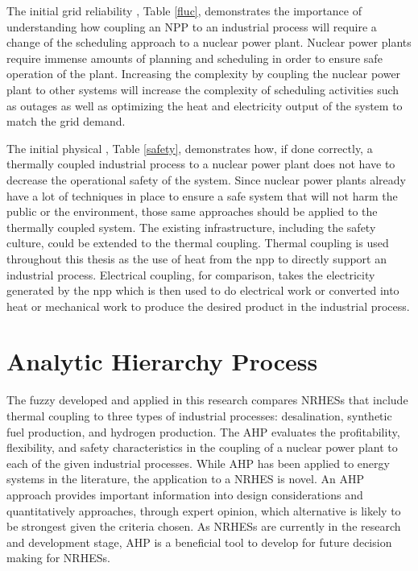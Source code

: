 The initial grid reliability \cite{pha}, Table \ref{fluc}, demonstrates the importance of understanding how coupling an NPP to an industrial process will require a change of the scheduling approach to a nuclear power plant. Nuclear power plants require immense amounts of planning and scheduling in order to ensure safe operation of the plant.  Increasing the complexity by coupling the nuclear power plant to other systems will increase the complexity of scheduling activities such as outages as well as optimizing the heat and electricity output of the system to match the grid demand.

The initial physical \cite{pha}, Table \ref{safety},  demonstrates how, if done correctly, a thermally coupled industrial process to a nuclear power plant does not have to decrease the operational safety of the system.  Since nuclear power plants already have a lot of techniques in place to ensure a safe system that will not harm the public or the environment, those same approaches should be applied to the thermally coupled system. The existing infrastructure, including the safety culture, could be extended to the thermal coupling. Thermal coupling is used throughout this thesis as the use of heat from the \ac{npp} to directly support an industrial process.  Electrical coupling, for comparison, takes the electricity generated by the \ac{npp} which is then used to do electrical work or converted into heat or mechanical work to produce the desired product in the industrial process.


\section{Analytic Hierarchy Process}
The fuzzy \cite{ahp} developed and applied in this research compares NRHESs that include thermal coupling to three types of industrial processes: desalination, synthetic fuel production, and hydrogen production.  The AHP evaluates the profitability, flexibility, and safety characteristics in the coupling of a nuclear power plant to each of the given industrial processes. While AHP has been applied to energy systems in the literature, the application to a NRHES is novel. An AHP approach provides important information into design considerations and quantitatively approaches, through expert opinion, which alternative is likely to be strongest given the criteria chosen. As NRHESs are currently in the research and development stage, AHP is a beneficial tool to develop for future decision making for NRHESs.


